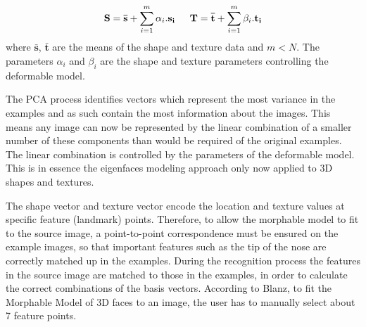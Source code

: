 \documentclass[11pt,a4paper]{report}
\begin{document}
\begin{equation}\label{eq:morhpable_pca}
\mathbf{S} = \mathbf{\bar{s}} + \sum_{i=1}^m\alpha_i.\mathbf{s_i} \indent \mathbf{T} = \mathbf{\bar{t}} + \sum_{i=1}^m\beta_i.\mathbf{t_i}
\end{equation}
where $\mathbf{\bar{s}}$, $\mathbf{\bar{t}}$ are the means of the shape and
texture data and $m < N$. The parameters $\alpha_i$ and $\beta_i$ are the
shape and texture parameters controlling the deformable model.

The PCA process identifies vectors which represent the most variance in
the examples and as such contain the most information about
the images. This means any image can now be represented by the linear
combination of a smaller number of these components than would be
required of the original examples. The linear combination is controlled by the
parameters of the deformable model. This is in essence the eigenfaces modeling approach
only now applied to 3D shapes and textures.

The shape vector and texture vector encode the location and texture values at
specific feature (landmark) points. Therefore, to allow the morphable model to fit to the source image, a
point-to-point correspondence must be ensured on the example
images, so that important features such as the tip of the nose are
correctly matched up in the examples. During the recognition process the features in the source image are matched to those in the examples, in order to
calculate the correct combinations of the basis vectors. According to Blanz, to fit the Morphable Model of 3D faces to an image, the user has to manually select
about 7 feature points. 
\end{document}
